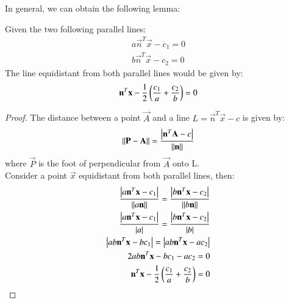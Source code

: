 
In general, we can obtain the following lemma:
\begin{lemma}
Given the two following parallel lines:
\begin{align}
    a\vec{n}^T\vec{x} - c_1 = 0\\
    b\vec{n}^T\vec{x} - c_2 = 0
    \label{aug/2/15/ref}
\end{align}
The line equidistant from both parallel lines would be given by:
\begin{align}
    \mathbf{n}^T\mathbf{x} - \frac{1}{2}\left({\frac{c_1}{a} + \frac{c_2}{b}}\right) = 0
\end{align}
\end{lemma}
\begin{proof}
The distance between a point $\vec{A}$ and a line $L = \vec{n}^T\vec{x} - c$ is given by:
\begin{align}
    \left\lVert\mathbf{P} - \mathbf{A}\right\rVert = \frac{\left\vert\mathbf{n}^T \mathbf{A} - c\right\vert}{\left\lVert\mathbf{n}\right\rVert}
\end{align}
where $\vec{P}$ is the foot of perpendicular from $\vec{A}$ onto L.\\
Consider a point $\vec{x}$ equidistant from both parallel lines, then:
\begin{align}
    \frac{\left\vert a\mathbf{n}^T\mathbf{x} - c_1\right\vert}{\left\lVert a\mathbf{n}\right\rVert} = 
    \frac{\left\vert b\mathbf{n}^T\mathbf{x} - c_2\right\vert}{\left\lVert b\mathbf{n}\right\rVert}\\
      \frac{\left\vert a\mathbf{n}^T\mathbf{x} - c_1\right\vert}{\left\vert a\right\vert} = 
    \frac{\left\vert b\mathbf{n}^T\mathbf{x} - c_2\right\vert}{\left\vert b\right\vert}\\
      \left\vert ab\mathbf{n}^T\mathbf{x} - bc_1\right\vert = \left\vert ab\mathbf{n}^T\mathbf{x} - ac_2\right\vert\\
      2ab\mathbf{n}^T\mathbf{x} - bc_1 - ac_2 = 0\\
      \mathbf{n}^T\mathbf{x} - \frac{1}{2}\left({\frac{c_1}{a} + \frac{c_2}{b}}\right) = 0
      \label{aug/2/15/ans}
      \end{align}
\end{proof}


